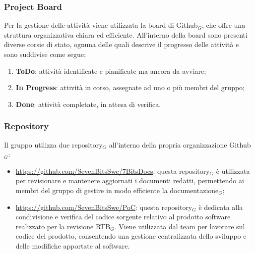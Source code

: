 \documentclass[10pt]{article}
\begin{document}
\begin{justify}
    \subsubsection{Project Board}
    Per la gestione delle attività viene utilizzata la board di Github$_G$, che offre una struttura organizzativa chiara ed efficiente. All'interno della board sono presenti diverse corsie di stato, ognuna delle quali descrive il progresso delle attività e sono suddivise come segue:
    \begin{enumerate}
        \item \textbf{ToDo}: attività identificate e pianificate ma ancora da avviare;
        \item \textbf{In Progress}: attività in corso, assegnate ad uno o più membri del gruppo;
        \item \textbf{Done}: attività completate, in attesa di verifica.
    \end{enumerate}

    \subsubsection{Repository}
    Il gruppo utilizza due repository$_G$ all'interno della propria organizzazione Github$_G$:
    \begin{itemize}
        \item \href{https://github.com/SevenBitsSwe/7BitsDocs}{https://github.com/SevenBitsSwe/7BitsDocs}: questa repository$_G$ è utilizzata per revisionare e mantenere aggiornati i documenti redatti, permettendo ai membri del gruppo di gestire in modo efficiente la documentazione$_G$;
        \item \href{https://github.com/SevenBitsSwe/PoC}{https://github.com/SevenBitsSwe/PoC}: questa repository$_G$ è dedicata alla condivisione e verifica del codice sorgente relativo al prodotto software realizzato per la revisione RTB$_G$. Viene utilizzata dal team per lavorare sul codice del prodotto, consentendo una gestione centralizzata dello sviluppo e delle modifiche apportate al software.
    \end{itemize}


\end{justify}
\end{document}
